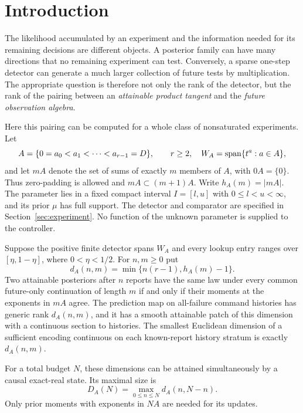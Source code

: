 \section{Introduction}
The likelihood accumulated by an experiment and the information needed
for its remaining decisions are different objects. A posterior family can
have many directions that no remaining experiment can test. Conversely,
a sparse one-step detector can generate a much larger collection of
future tests by multiplication. The appropriate question is therefore not
only the rank of the detector, but the rank of the pairing between an
\emph{attainable product tangent} and the \emph{future observation algebra}.

Here this pairing can be computed for a whole class of nonsaturated
experiments. Let
\[
 A=\{0=a_0<a_1<\cdots<a_{r-1}=D\},\qquad r\ge2,
 \quad W_A=\operatorname{span}\{t^a:a\in A\},
\]
and let $mA$ denote the set of sums of exactly $m$ members of $A$, with
$0A=\{0\}$. Thus zero-padding is allowed and $mA\subset(m+1)A$.
Write $h_A(m)=|mA|$. The parameter lies in a fixed compact interval
$I=[l,u]$ with $0\le l<u<\infty$, and its prior $\mu$ has full support.
The detector and comparator are specified in Section~\ref{sec:experiment}.
No function of the unknown parameter is supplied to the controller.

\begin{theorem}\label{thm:main}
Suppose the positive finite detector spans $W_A$ and every lookup entry
ranges over $[\eta,1-\eta]$, where $0<\eta<1/2$. For $n,m\ge0$ put
\begin{equation}\label{eq:main-dimension}
 d_A(n,m)=\min\{n(r-1),h_A(m)-1\}.
\end{equation}
Two attainable posteriors after $n$ reports have the same law under every
common future-only continuation of length $m$ if and only if their moments
at the exponents in $mA$ agree. The prediction map on all-failure command
histories has generic rank $d_A(n,m)$, and it has a smooth attainable patch
of this dimension with a continuous section to histories. The smallest
Euclidean dimension of a sufficient encoding continuous on each
known-report history stratum is exactly $d_A(n,m)$.

For a total budget $N$, these dimensions can be attained simultaneously
by a causal exact-real state. Its maximal size is
\begin{equation}\label{eq:peak}
 D_A(N)=\max_{0\le n\le N}d_A(n,N-n).
\end{equation}
Only prior moments with exponents in $NA$ are needed for its updates.
\end{theorem}


